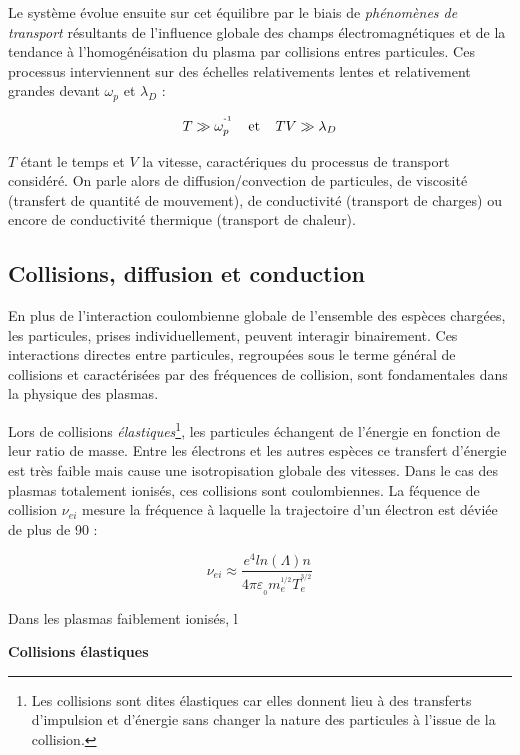 Le système évolue ensuite sur cet équilibre par le biais de
\emph{phénomènes de transport} résultants de l'influence
globale des champs électromagnétiques et de la tendance à
l'homogénéisation du plasma par collisions entres particules.
Ces processus interviennent sur des échelles relativements
lentes et relativement grandes devant $\omega_p$ et $\lambda_D$ :

\begin{equation}
T\gg \omega_p^{\operatorname{^{-1}}} \;\;\;\;\text{et}\;\;\;\;T V\gg\lambda_D
\end{equation}

$T$ étant le temps et $V$ la vitesse, caractériques du processus de transport
considéré.
On parle alors de diffusion/convection de particules, de viscosité (transfert de
quantité de mouvement), de conductivité (transport de charges) ou encore de
conductivité thermique (transport de chaleur).

\subsection{Collisions, diffusion et conduction}
En plus de l'interaction coulombienne globale de l'ensemble des espèces chargées, 
les particules, prises individuellement, peuvent interagir binairement. 
Ces interactions directes entre particules, regroupées
sous le terme général de collisions et caractérisées par des fréquences de collision, 
sont fondamentales dans la physique des plasmas.

Lors de collisions \emph{élastiques}\footnote{Les collisions sont dites élastiques car
elles donnent lieu à des transferts d'impulsion et d'énergie sans changer
la nature des particules à l'issue de la collision.}, les particules échangent de l'énergie 
en fonction de leur ratio de masse. Entre les électrons et les autres espèces ce transfert 
d'énergie est très faible mais cause une isotropisation globale des vitesses.
Dans le cas des plasmas totalement ionisés, ces collisions sont coulombiennes. La féquence de 
collision $\nu_{ei}$ mesure la fréquence à laquelle la trajectoire d'un électron est déviée 
de plus de \unit{90}{\degree} :

\begin{equation}
	\nu_{ei}\approx\frac{e^4 ln(\Lambda) n}{4\pi\varepsilon_{_0}m_e^{^{1/2}}T_e^{^{3/2}}}
\end{equation}

Dans les plasmas faiblement ionisés, l

\textbf{Collisions élastiques}

